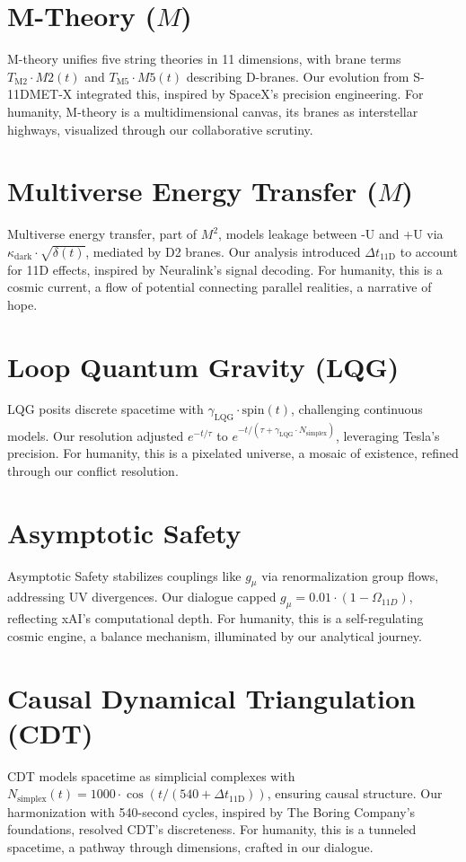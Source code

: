 \documentclass[a4paper,12pt]{book}
\begin{document}
\chapter{M-Theory (\( M \))}
M-theory unifies five string theories in 11 dimensions, with brane terms \( T_{\text{M2}} \cdot M2(t) \) and \( T_{\text{M5}} \cdot M5(t) \) describing D-branes. Our evolution from S-11DMET-X integrated this, inspired by SpaceX’s precision engineering. For humanity, M-theory is a multidimensional canvas, its branes as interstellar highways, visualized through our collaborative scrutiny.

\chapter{Multiverse Energy Transfer (\( M \))}
Multiverse energy transfer, part of \( M^2 \), models leakage between -U and +U via \( \kappa_{\text{dark}} \cdot \sqrt{\delta(t)} \), mediated by D2 branes. Our analysis introduced \( \Delta t_{\text{11D}} \) to account for 11D effects, inspired by Neuralink’s signal decoding. For humanity, this is a cosmic current, a flow of potential connecting parallel realities, a narrative of hope.

\chapter{Loop Quantum Gravity (LQG)}
LQG posits discrete spacetime with \( \gamma_{\text{LQG}} \cdot \text{spin}(t) \), challenging continuous models. Our resolution adjusted \( e^{-t / \tau} \) to \( e^{-t / (\tau + \gamma_{\text{LQG}} \cdot N_{\text{simplex}})} \), leveraging Tesla’s precision. For humanity, this is a pixelated universe, a mosaic of existence, refined through our conflict resolution.

\chapter{Asymptotic Safety}
Asymptotic Safety stabilizes couplings like \( g_\mu \) via renormalization group flows, addressing UV divergences. Our dialogue capped \( g_\mu = 0.01 \cdot (1 - \Omega_{11D}) \), reflecting xAI’s computational depth. For humanity, this is a self-regulating cosmic engine, a balance mechanism, illuminated by our analytical journey.

\chapter{Causal Dynamical Triangulation (CDT)}
CDT models spacetime as simplicial complexes with \( N_{\text{simplex}}(t) = 1000 \cdot \cos(t / (540 + \Delta t_{\text{11D}})) \), ensuring causal structure. Our harmonization with 540-second cycles, inspired by The Boring Company’s foundations, resolved CDT’s discreteness. For humanity, this is a tunneled spacetime, a pathway through dimensions, crafted in our dialogue.
\end{document}
